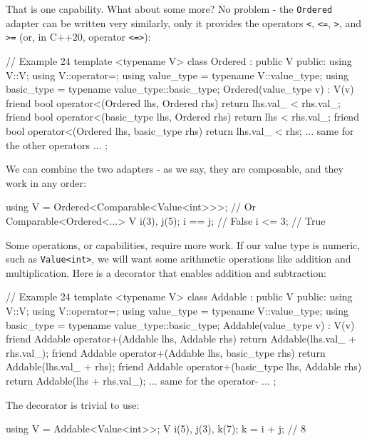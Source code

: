 That is one capability. What about some more? No problem - the \texttt{Ordered} adapter can be written very similarly, only it provides the operators \texttt{\textless{}}, \texttt{\textless{}=}, \texttt{\textgreater{}}, and \texttt{\textgreater{}=} (or, in C++20, operator \texttt{\textless{}=\textgreater{}}):

\begin{code}
// Example 24
template <typename V> class Ordered : public V {
  public:
  using V::V;
  using V::operator=;
  using value_type = typename V::value_type;
  using basic_type = typename value_type::basic_type;
  Ordered(value_type v) : V(v) {}
  friend bool operator<(Ordered lhs, Ordered rhs) {
    return lhs.val_ < rhs.val_;
  }
  friend bool operator<(basic_type lhs, Ordered rhs) {
    return lhs < rhs.val_;
  }
  friend bool operator<(Ordered lhs, basic_type rhs) {
    return lhs.val_ < rhs;
  }
  ... same for the other operators ...
};
\end{code}

We can combine the two adapters - as we say, they are composable, and they work in any order:

\begin{code}
using V = Ordered<Comparable<Value<int>>>;
// Or Comparable<Ordered<...>
V i(3), j(5);
i == j; // False
i <= 3; // True
\end{code}

Some operations, or capabilities, require more work. If our value type is numeric, such as \texttt{Value\textless{}int\textgreater{}}, we will want some arithmetic operations like addition and multiplication. Here is a decorator that enables addition and subtraction:

\begin{code}
// Example 24
template <typename V> class Addable : public V {
  public:
  using V::V;
  using V::operator=;
  using value_type = typename V::value_type;
  using basic_type = typename value_type::basic_type;
  Addable(value_type v) : V(v) {}
  friend Addable operator+(Addable lhs, Addable rhs) {
    return Addable(lhs.val_ + rhs.val_);
  }
  friend Addable operator+(Addable lhs, basic_type rhs) {
    return Addable(lhs.val_ + rhs);
  }
  friend Addable operator+(basic_type lhs, Addable rhs) {
    return Addable(lhs + rhs.val_);
  }
  ... same for the operator- ...
};
\end{code}

The decorator is trivial to use:

\begin{code}
using V = Addable<Value<int>>;
V i(5), j(3), k(7);
k = i + j; // 8
\end{code}

